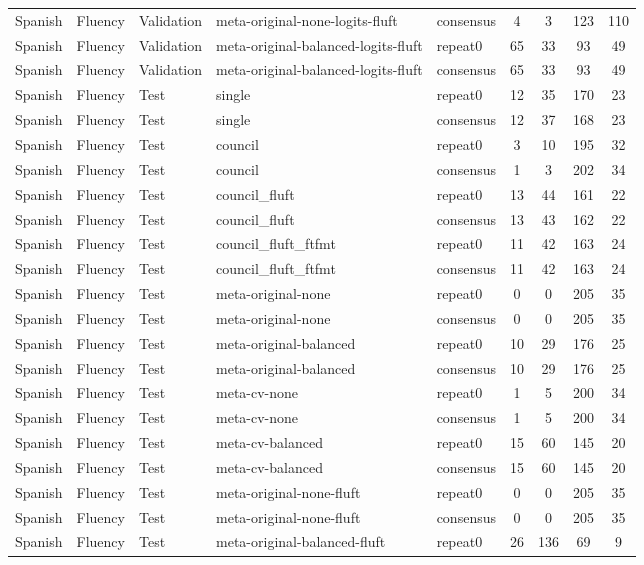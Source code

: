 \begin{tabular}{lllllcccc}
Spanish & Fluency & Validation & meta-original-none-logits-fluft & consensus & 4 & 3 & 123 & 110 \\
Spanish & Fluency & Validation & meta-original-balanced-logits-fluft & repeat0 & 65 & 33 & 93 & 49 \\
Spanish & Fluency & Validation & meta-original-balanced-logits-fluft & consensus & 65 & 33 & 93 & 49 \\
Spanish & Fluency & Test & single & repeat0 & 12 & 35 & 170 & 23 \\
Spanish & Fluency & Test & single & consensus & 12 & 37 & 168 & 23 \\
Spanish & Fluency & Test & council & repeat0 & 3 & 10 & 195 & 32 \\
Spanish & Fluency & Test & council & consensus & 1 & 3 & 202 & 34 \\
Spanish & Fluency & Test & council\_fluft & repeat0 & 13 & 44 & 161 & 22 \\
Spanish & Fluency & Test & council\_fluft & consensus & 13 & 43 & 162 & 22 \\
Spanish & Fluency & Test & council\_fluft\_ftfmt & repeat0 & 11 & 42 & 163 & 24 \\
Spanish & Fluency & Test & council\_fluft\_ftfmt & consensus & 11 & 42 & 163 & 24 \\
Spanish & Fluency & Test & meta-original-none & repeat0 & 0 & 0 & 205 & 35 \\
Spanish & Fluency & Test & meta-original-none & consensus & 0 & 0 & 205 & 35 \\
Spanish & Fluency & Test & meta-original-balanced & repeat0 & 10 & 29 & 176 & 25 \\
Spanish & Fluency & Test & meta-original-balanced & consensus & 10 & 29 & 176 & 25 \\
Spanish & Fluency & Test & meta-cv-none & repeat0 & 1 & 5 & 200 & 34 \\
Spanish & Fluency & Test & meta-cv-none & consensus & 1 & 5 & 200 & 34 \\
Spanish & Fluency & Test & meta-cv-balanced & repeat0 & 15 & 60 & 145 & 20 \\
Spanish & Fluency & Test & meta-cv-balanced & consensus & 15 & 60 & 145 & 20 \\
Spanish & Fluency & Test & meta-original-none-fluft & repeat0 & 0 & 0 & 205 & 35 \\
Spanish & Fluency & Test & meta-original-none-fluft & consensus & 0 & 0 & 205 & 35 \\
Spanish & Fluency & Test & meta-original-balanced-fluft & repeat0 & 26 & 136 & 69 & 9 \\

\end{tabular}
